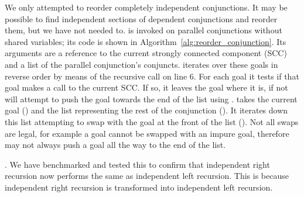 We only attempted to reorder completely independent conjunctions.
It may be possible to find independent sections of dependent conjunctions
and reorder them,
but we have not needed to.
\reorder is invoked on parallel conjunctions without shared variables;
its code is shown in Algorithm~\ref{alg:reorder_conjunction}.
Its arguments are a reference to the current strongly connected component (SCC)
and a list of the parallel conjunction's conjuncts.
\reorder iterates over these goals in reverse order by means of the
recursive call on line 6.
For each goal it tests if that goal makes a call to the current SCC.
If so, it leaves the goal where it is,
if not \reorder will attempt to push the goal towards the end of the
list using \trypushconjlater.
\trypushconjlater takes the current goal () and the list
representing the rest of the conjunction ().
It iterates down this list attempting to swap  with the goal at
the front of the list ().
Not all swaps are legal,
for example a goal cannot be swapped with an impure goal,
therefore \trypushconjlater may not always push a goal all the way to the
end of the list.

.
We have benchmarked and tested this to confirm that independent right recursion
now performs the same as independent left recursion.
This is because independent right recursion is transformed into independent
left recursion.



